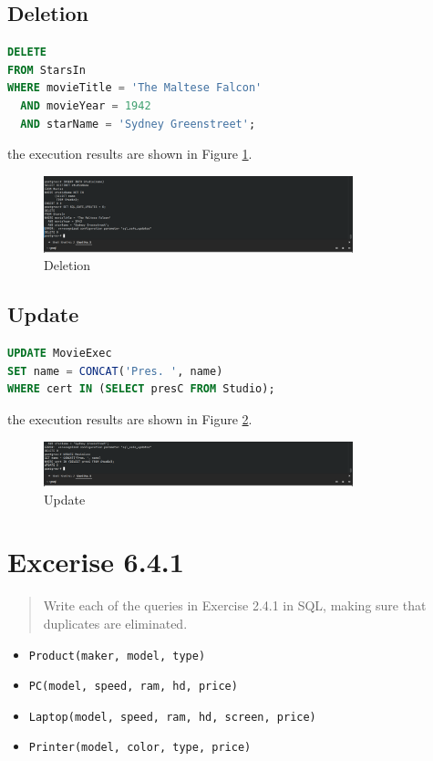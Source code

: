 \documentclass{cshwk}
\begin{document}
\subsection{Deletion}

\begin{lstlisting}[language=sql]
DELETE
FROM StarsIn
WHERE movieTitle = 'The Maltese Falcon'
  AND movieYear = 1942
  AND starName = 'Sydney Greenstreet';
\end{lstlisting}

the execution results are shown in Figure \ref{fig:deletion}.
\begin{figure}[H]
    \centering
    \includegraphics[width=0.8\textwidth]{hw6-7.png}
    \caption{Deletion}
    \label{fig:deletion}
\end{figure}

\subsection{Update}

\begin{lstlisting}[language=sql]
UPDATE MovieExec
SET name = CONCAT('Pres. ', name)
WHERE cert IN (SELECT presC FROM Studio);
\end{lstlisting}

the execution results are shown in Figure \ref{fig:update}.
\begin{figure}[H]
    \centering
    \includegraphics[width=0.8\textwidth]{hw6-8.png}
    \caption{Update}
    \label{fig:update}
\end{figure}

\section{Excerise 6.4.1}
\begin{quote}
    Write each of the queries in Exercise 2.4.1 in SQL, making
    sure that duplicates are eliminated.
\end{quote}
\begin{itemize}
    \item \texttt{Product(maker, model, type)}
    \item \texttt{PC(model, speed, ram, hd, price)}
    \item \texttt{Laptop(model, speed, ram, hd, screen, price)}
    \item \texttt{Printer(model, color, type, price)}
\end{itemize}
\end{document}
